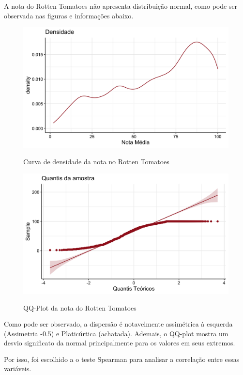 \documentclass[a4paper, 12pt]{article} %
\begin{document}
A nota do Rotten Tomatoes não apresenta distribuição normal, como pode ser observada nas figuras e informações abaixo.

\begin{figure}[H]
    \centering
    \caption{Curva de densidade da nota no Rotten Tomatoes }
    \includegraphics[scale=0.15]{Fig_Rotten_Densidade.png}
    \label{fig:my_label}
\end{figure}

\begin{figure}[H]
    \centering
    \caption{QQ-Plot da nota do Rotten Tomatoes}
    \includegraphics[scale=0.15]{Fig_Rotten_QQ.png}
    \label{fig:my_label}
\end{figure}

Como pode ser observado, a dispersão é notavelmente assimétrica à esquerda (Assimetria -0.5) e Platicúrtica (achatada). Ademais, o QQ-plot mostra um desvio significato da normal principalmente para os valores em seus extremos. 

Por isso, foi escolhido a o teste Spearman para analisar a correlação entre essas variáveis.
 
\end{document}
